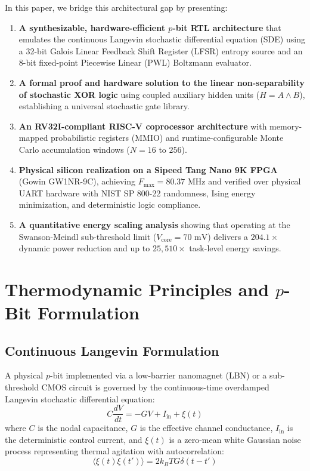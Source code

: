 \documentclass[journal,10pt,twocolumn]{IEEEtran}
\begin{document}
In this paper, we bridge this architectural gap by presenting:
\begin{enumerate}
    \item \textbf{A synthesizable, hardware-efficient $p$-bit RTL architecture} that emulates the continuous Langevin stochastic differential equation (SDE) using a 32-bit Galois Linear Feedback Shift Register (LFSR) entropy source and an 8-bit fixed-point Piecewise Linear (PWL) Boltzmann evaluator.
    \item \textbf{A formal proof and hardware solution to the linear non-separability of stochastic XOR logic} using coupled auxiliary hidden units ($H = A \land B$), establishing a universal stochastic gate library.
    \item \textbf{An RV32I-compliant RISC-V coprocessor architecture} with memory-mapped probabilistic registers (MMIO) and runtime-configurable Monte Carlo accumulation windows ($N = 16$ to $256$).
    \item \textbf{Physical silicon realization on a Sipeed Tang Nano 9K FPGA} (Gowin GW1NR-9C), achieving $F_{\text{max}} = 80.37\text{ MHz}$ and verified over physical UART hardware with NIST SP 800-22 randomness, Ising energy minimization, and deterministic logic compliance.
    \item \textbf{A quantitative energy scaling analysis} showing that operating at the Swanson-Meindl sub-threshold limit ($V_{\text{core}} = 70\text{ mV}$) delivers a $204.1\times$ dynamic power reduction and up to $25,510\times$ task-level energy savings.
\end{enumerate}

\section{Thermodynamic Principles and $p$-Bit Formulation}

\subsection{Continuous Langevin Formulation}
A physical $p$-bit implemented via a low-barrier nanomagnet (LBN) or a sub-threshold CMOS circuit is governed by the continuous-time overdamped Langevin stochastic differential equation:
\begin{equation}
C \frac{dV}{dt} = -G V + I_{\text{in}} + \xi(t)
\label{eq:langevin}
\end{equation}
where $C$ is the nodal capacitance, $G$ is the effective channel conductance, $I_{\text{in}}$ is the deterministic control current, and $\xi(t)$ is a zero-mean white Gaussian noise process representing thermal agitation with autocorrelation:
\begin{equation}
\langle \xi(t) \xi(t') \rangle = 2 k_B T G \delta(t - t')
\end{equation}
\end{document}
